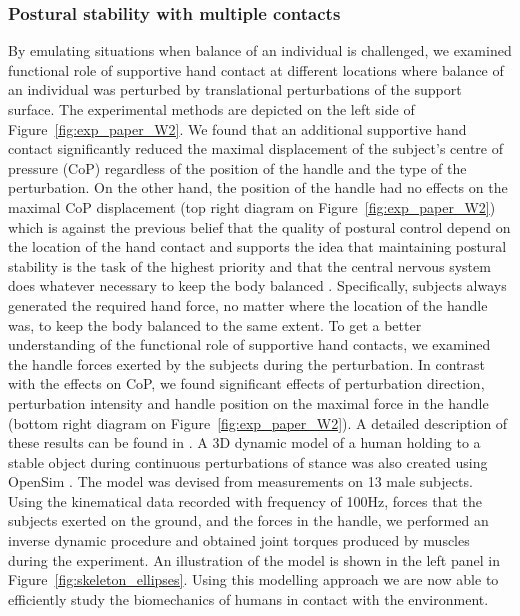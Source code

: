 \documentclass[final,5p,twocolumn]{elsarticle}
\begin{document}
\subsubsection{Postural stability with multiple contacts}
By emulating situations when balance of an individual is challenged, we examined functional role of supportive hand contact at different locations where balance of an individual was perturbed by translational perturbations of the support surface. The experimental methods are depicted on the left side of Figure~\ref{fig:exp_paper_W2}. We found that an additional supportive hand contact significantly reduced the maximal displacement of the subject's centre of pressure (CoP) regardless of the position of the handle and the type of the perturbation. On the other hand, the position of the handle had no effects on the maximal CoP displacement (top right diagram on Figure~\ref{fig:exp_paper_W2}) which is against the previous belief that the quality of postural control depend on the location of the hand contact \cite{Sarraf2014} and supports the idea that maintaining postural stability is the task of the highest priority and that the central nervous system does whatever necessary to keep the body balanced \cite{Winter1995}. Specifically, subjects always generated the required hand force, no matter where the location of the handle was, to keep the body balanced to the same extent. To get a better understanding of the functional role of supportive hand contacts, we examined the handle forces exerted by the subjects during the perturbation. In contrast with the effects on CoP, we found significant effects of perturbation direction, perturbation intensity and handle position on the maximal force in the handle (bottom right diagram on Figure~\ref{fig:exp_paper_W2}). A detailed description of these results can be found in  \cite{babivc2014effects}. A 3D dynamic model of a human holding to a stable object during continuous perturbations of stance was also created using OpenSim \cite{OpenSim}. The model was devised from measurements on 13 male subjects. Using the kinematical data recorded with frequency of 100Hz, forces that the subjects exerted on the ground, and the forces in the handle, we performed an inverse dynamic procedure and obtained joint torques produced by muscles during the experiment. An illustration of the model is shown in the left panel in Figure~\ref{fig:skeleton_ellipses}. Using this modelling approach we are now able to efficiently study the biomechanics of humans in contact with the environment.
\end{document}
